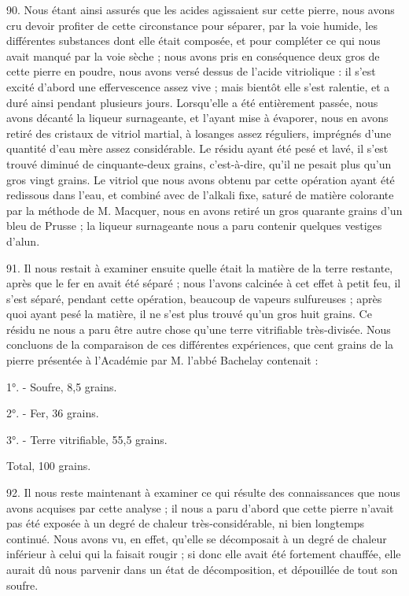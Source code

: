 \documentclass[a4paper, 11pt, oneside, polutonikogreek, french]{article}
\begin{document}
90. Nous étant ainsi assurés que les acides agissaient sur cette pierre, nous avons cru devoir profiter de cette circonstance pour séparer, par la voie humide, les différentes substances dont elle était composée, et pour compléter ce qui nous avait manqué par la voie sèche ; nous avons pris en conséquence deux gros de cette pierre en poudre, nous avons versé dessus de l'acide vitriolique : il s'est excité d'abord une effervescence assez vive ; mais bientôt elle s'est ralentie, et a duré ainsi pendant plusieurs jours. Lorsqu'elle a été entièrement passée, nous avons décanté la liqueur surnageante, et l'ayant mise à évaporer, nous en avons retiré des cristaux de vitriol martial, à losanges assez réguliers, imprégnés d'une quantité d'eau mère assez considérable. Le résidu ayant été pesé et lavé, il s'est trouvé diminué de cinquante-deux grains, c'est-à-dire, qu'il ne pesait plus qu'un gros vingt grains. Le vitriol que nous avons obtenu par cette opération ayant été redissous dans l'eau, et combiné avec de l'alkali fixe, saturé de matière colorante par la méthode de M. Macquer, nous en avons retiré un gros quarante grains d'un bleu de Prusse ; la liqueur surnageante nous a paru contenir quelques vestiges d'alun.

91. Il nous restait à examiner ensuite quelle était la matière de la terre restante, après que le fer en avait été séparé ; nous l'avons calcinée à cet effet à petit feu, il s'est séparé, pendant cette opération, beaucoup de vapeurs sulfureuses ; après quoi ayant pesé la matière, il ne s'est plus trouvé qu'un gros huit grains. Ce résidu ne nous a paru être autre chose qu'une terre vitrifiable très-divisée. Nous concluons de la comparaison de ces différentes expériences, que cent grains de la pierre présentée à l'Académie par M. l'abbé Bachelay contenait :

1°. - Soufre, 8,5 grains.

2°. - Fer, 36 grains.

3°. - Terre vitrifiable, 55,5 grains.

Total, 100 grains.

92. Il nous reste maintenant à examiner ce qui résulte des connaissances que nous avons acquises par cette analyse ; il nous a paru d'abord que cette pierre n'avait pas été exposée à un degré de chaleur très-considérable, ni bien longtemps continué. Nous avons vu, en effet, qu'elle se décomposait à un degré de chaleur inférieur à celui qui la faisait rougir ; si donc elle avait été fortement chauffée, elle aurait dû nous parvenir dans un état de décomposition, et dépouillée de tout son soufre.
\end{document}

